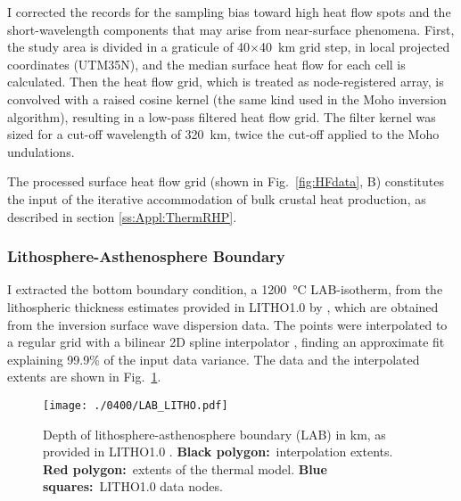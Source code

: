 I corrected the records for the sampling bias toward high heat flow spots \parencite{Mareschal2013} and the short-wavelength components that may arise from near-surface phenomena.
First, the study area is divided in a graticule of \num{40}$\times$\SI{40}{\kilo \metre} grid step, in local projected coordinates (UTM35N), and the median surface heat flow for each cell is calculated.
Then the heat flow grid, which is treated as node-registered array, is convolved with a raised cosine kernel (the same kind used in the Moho inversion algorithm), resulting in a low-pass filtered heat flow grid.
The filter kernel was sized for a cut-off wavelength of \SI{320}{\kilo \metre}, twice the cut-off applied to the Moho undulations.

The processed surface heat flow grid (shown in Fig.~\ref{fig:HFdata}, B) constitutes the input of the iterative accommodation of bulk crustal heat production, as described in section \ref{ss:Appl:ThermRHP}.

\subsubsection{Lithosphere-Asthenosphere Boundary}
\label{sss:Appl:ThermInputLAB}

I extracted the bottom boundary condition, a \SI{1200}{\celsius} LAB-isotherm, from the lithospheric thickness estimates provided in LITHO1.0 by \textcite{Pasyanos2014}, which are obtained from the inversion surface wave dispersion data.
The points were interpolated to a regular grid with a bilinear 2D spline interpolator \parencite{Wessel2009}, finding an approximate fit explaining 99.9\% of the input data variance.
The data and the interpolated extents are shown in Fig.~\ref{fig:LAB}.

\begin{figure}
	\begin{adjustbox}{center}
	\texttt{[image: ./0400/LAB\_LITHO.pdf]}
	\end{adjustbox}
	\caption[Depth of lithosphere-asthenosphere boundary (LAB), as provided in LITHO1.0.]{Depth of lithosphere-asthenosphere boundary (LAB) in km, as provided in LITHO1.0 \parencite{Pasyanos2014}. \textbf{Black polygon:}~interpolation extents. \textbf{Red polygon:}~extents of the thermal model. \textbf{Blue squares:}~LITHO1.0 data nodes.}
	\label{fig:LAB}
\end{figure}

